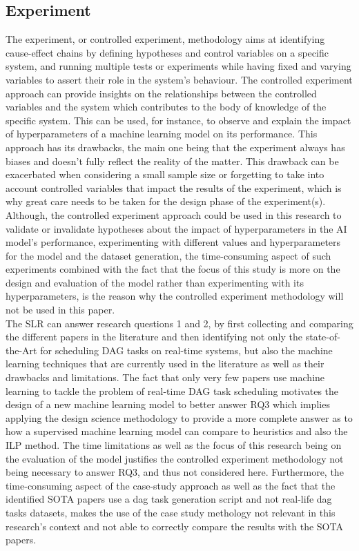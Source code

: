 \subsection{Experiment}
 
 
The experiment, or controlled experiment, methodology aims at identifying cause-effect 
chains by defining hypotheses and control variables on a specific system,
and running multiple tests or experiments while having fixed and varying variables to assert 
their role in the system's behaviour\cite{basili2007controlledExperiment}.
The controlled experiment approach 
can provide insights on the relationships between the controlled variables and the system
which contributes to the body of knowledge of the specific system.
This can be used, for instance, to observe and explain the impact of hyperparameters of a machine learning
model on its performance.
This approach has its drawbacks, the main one being 
that the experiment always has biases and doesn't fully reflect the reality
of the matter. This drawback can be exacerbated when considering 
a small sample size or forgetting
to take into account controlled variables that impact the results
of the experiment, which is why great care needs to be taken 
for the design phase of the experiment(s).
Although, the controlled experiment approach could be used in this research to validate or invalidate hypotheses
about the impact of hyperparameters in the AI model's performance,
experimenting with different values and hyperparameters for the model and the dataset generation,
the time-consuming aspect of such experiments
combined with the fact that 
the focus of this study is more on the design and evaluation of the model rather than 
experimenting with its hyperparameters,
is the reason why the controlled experiment methodology will not be used in this paper.
\\

The SLR can answer research questions 1 and 2,
by first collecting and comparing the different papers in the literature
and then identifying not only the state-of-the-Art for scheduling DAG tasks on real-time systems,
but also the machine learning techniques that are currently used in the literature as well as their drawbacks and limitations.
The fact that only very few papers use machine learning to tackle the problem of real-time DAG task scheduling
motivates the design of a new machine learning model to better answer RQ3 which implies 
applying the design science methodology to provide a more complete answer as to how a supervised machine learning model 
can compare to heuristics and also the ILP method.
The time limitations as well as the focus of this research being on the evaluation of the model
justifies the controlled experiment methodology not being necessary to answer RQ3, and thus not considered here. 
Furthermore, the time-consuming aspect of the case-study approach as well as the fact that the identified SOTA papers
use a dag task generation script and not real-life dag tasks datasets, makes
the use of the case study methology not relevant in this research's context and not able to correctly compare the results with 
the SOTA papers.

